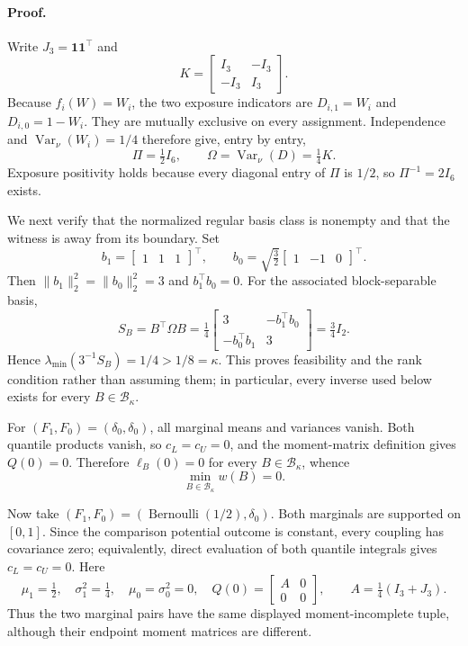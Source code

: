 \paragraph{Proof.}
Write \(J_3=\mathbf 1\mathbf 1^{\top}\) and
\[
K=\begin{bmatrix}I_3&-I_3\\-I_3&I_3\end{bmatrix}.
\]
Because \(f_i(W)=W_i\), the two exposure indicators are \(D_{i,1}=W_i\) and \(D_{i,0}=1-W_i\).  They are mutually exclusive on every assignment.  Independence and \(\operatorname{Var}_{\nu}(W_i)=1/4\) therefore give, entry by entry,
\[
\Pi=\tfrac12 I_6,
\qquad
\Omega=\operatorname{Var}_{\nu}(D)=\tfrac14K.
\]
Exposure positivity holds because every diagonal entry of \(\Pi\) is \(1/2\), so \(\Pi^{-1}=2I_6\) exists.

We next verify that the normalized regular basis class is nonempty and that the witness is away from its boundary.  Set
\[
b_1=\begin{bmatrix}1&1&1\end{bmatrix}^{\top},
\qquad
b_0=\sqrt{\tfrac32}\begin{bmatrix}1&-1&0\end{bmatrix}^{\top}.
\]
Then \(\lVert b_1\rVert_2^2=\lVert b_0\rVert_2^2=3\) and \(b_1^{\top}b_0=0\).  For the associated block-separable basis,
\[
S_B=B^{\top}\Omega B
=\tfrac14
\begin{bmatrix}
3&-b_1^{\top}b_0\\
-b_0^{\top}b_1&3
\end{bmatrix}
=\tfrac34I_2.
\]
Hence \(\lambda_{\min}(3^{-1}S_B)=1/4>1/8=\kappa\).  This proves feasibility and the rank condition rather than assuming them; in particular, every inverse used below exists for every \(B\in\mathcal B_\kappa\).

For \((F_1,F_0)=(\delta_0,\delta_0)\), all marginal means and variances vanish.  Both quantile products vanish, so \(c_L=c_U=0\), and the moment-matrix definition gives \(Q(0)=0\).  Therefore \(\ell_B(0)=0\) for every \(B\in\mathcal B_\kappa\), whence
\[
\min_{B\in\mathcal B_\kappa}w(B)=0.
\]

Now take \((F_1,F_0)=(\operatorname{Bernoulli}(1/2),\delta_0)\).  Both marginals are supported on \([0,1]\).  Since the comparison potential outcome is constant, every coupling has covariance zero; equivalently, direct evaluation of both quantile integrals gives \(c_L=c_U=0\).  Here
\[
\mu_1=\tfrac12,
\quad \sigma_1^2=\tfrac14,
\quad \mu_0=\sigma_0^2=0,
\quad
Q(0)=\begin{bmatrix}A&0\\0&0\end{bmatrix},
\qquad
A=\tfrac14(I_3+J_3).
\]
Thus the two marginal pairs have the same displayed moment-incomplete tuple, although their endpoint moment matrices are different.

